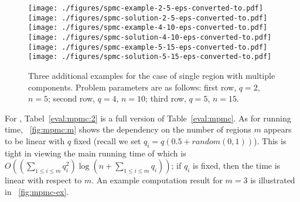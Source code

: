 \begin{figure}[ht!]
    \centering
    \texttt{[image: ./figures/spmc-example-2-5-eps-converted-to.pdf]}
    \texttt{[image: ./figures/spmc-solution-2-5-eps-converted-to.pdf]}
    \vspace*{2mm} \\
    \texttt{[image: ./figures/spmc-example-4-10-eps-converted-to.pdf]}
    \texttt{[image: ./figures/spmc-solution-4-10-eps-converted-to.pdf]} \\
    \vspace*{2mm}
    \texttt{[image: ./figures/spmc-example-5-15-eps-converted-to.pdf]}
    \hspace{5mm}
    \texttt{[image: ./figures/spmc-solution-5-15-eps-converted-to.pdf]}
    \vspace*{-3mm}
    \caption[Three additional examples for the case of single region with multiple components]{\label{fig:opg-more-spmc-ex} Three additional examples for the 
		case of single region with multiple components. Problem parameters 
		are as follows: first row, $q = 2$, $n = 5$; second row, $q = 4$, 
		$n = 10$; third row, $q = 5$, $n = 15$.} 
    \vspace*{-4mm}
\end{figure}


For \algoMRG, Tabel~\ref{eval:mpmc:2} is a full version of 
Table~\ref{eval:mpmc}. As for running time, ~\ref{fig:mpmc:m} shows 
the dependency on the number of regions $m$ appears to be linear with 
$q$ fixed (recall we set $q_i = q(0.5 + random(0,1))$). This is tight
in viewing the main running time of \algoMRG which is 
$O((\sum_{1\le i \le m} q_i^2) \log(n + \sum_{1\le i \le m} q_i))$; if
$q_i$ is fixed, then the time is linear with respect to $m$. An example 
computation result for $m = 3$ is illustrated in ~\ref{fig:mpmc-ex}. 

